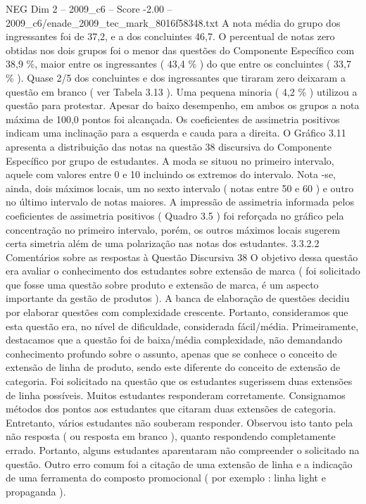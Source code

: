 \begin{textsample}{NEG Dim 2 – 2009\_c6 – Score -2.00 – 2009\_c6/enade\_2009\_tec\_mark\_8016f58348.txt}
A nota média do grupo dos ingressantes foi de 37,2, e a dos concluintes 46,7.
O percentual de notas zero obtidas nos dois grupos foi o menor das questões do Componente Específico com 38,9 \%, maior entre os ingressantes ( 43,4 \% ) do que entre os concluintes ( 33,7 \% ).
Quase 2/5 dos concluintes e dos ingressantes que tiraram zero deixaram a questão em branco ( ver Tabela 3.13 ).
Uma pequena minoria ( 4,2 \% ) utilizou a questão para protestar.
Apesar do baixo desempenho, em ambos os grupos a nota máxima de 100,0 pontos foi alcançada.
Os coeficientes de assimetria positivos indicam uma inclinação para a esquerda e cauda para a direita.
O Gráfico 3.11 apresenta a distribuição das notas na questão 38 discursiva do Componente Específico por grupo de estudantes.
A moda se situou no primeiro intervalo, aquele com valores entre 0 e 10 incluindo os extremos do intervalo.
Nota -se, ainda, dois máximos locais, um no sexto intervalo ( notas entre 50 e 60 ) e outro no último intervalo de notas maiores.
A impressão de assimetria informada pelos coeficientes de assimetria positivos ( Quadro 3.5 ) foi reforçada no gráfico pela concentração no primeiro intervalo, porém, os outros máximos locais sugerem certa simetria além de uma polarização nas notas dos estudantes. 3.3.2.2 Comentários sobre as respostas à Questão Discursiva 38 O objetivo dessa questão era avaliar o conhecimento dos estudantes sobre extensão de marca ( foi solicitado que fosse uma questão sobre produto e extensão de marca, é um aspecto importante da gestão de produtos ).
A banca de elaboração de questões decidiu por elaborar questões com complexidade crescente.
Portanto, consideramos que esta questão era, no nível de dificuldade, considerada fácil/média.
Primeiramente, destacamos que a questão foi de baixa/média complexidade, não demandando conhecimento profundo sobre o assunto, apenas que se conhece o conceito de extensão de linha de produto, sendo este diferente do conceito de extensão de categoria.
Foi solicitado na questão que os estudantes sugerissem duas extensões de linha possíveis.
Muitos estudantes responderam corretamente.
Consignamos métodos dos pontos aos estudantes que citaram duas extensões de categoria.
Entretanto, vários estudantes não souberam responder.
Observou isto tanto pela não resposta ( ou resposta em branco ), quanto respondendo completamente errado.
Portanto, alguns estudantes aparentaram não compreender o solicitado na questão.
Outro erro comum foi a citação de uma extensão de linha e a indicação de uma ferramenta do composto promocional ( por exemplo : linha light e propaganda ).

\end{textsample}
